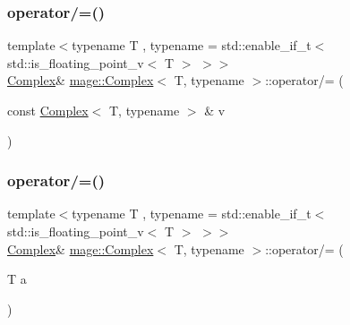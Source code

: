 \subsubsection{\texorpdfstring{operator/=()}{operator/=()}\hspace{0.1cm}{\footnotesize\ttfamily [1/2]}}
{\footnotesize\ttfamily template$<$typename T , typename  = std\+::enable\+\_\+if\+\_\+t$<$ std\+::is\+\_\+floating\+\_\+point\+\_\+v$<$ T $>$ $>$$>$ \\
\mbox{\hyperlink{structmage_1_1_complex}{Complex}}\& \mbox{\hyperlink{structmage_1_1_complex}{mage\+::\+Complex}}$<$ T, typename $>$\+::operator/= (\begin{DoxyParamCaption}\item[{const \mbox{\hyperlink{structmage_1_1_complex}{Complex}}$<$ T, typename $>$ \&}]{v }\end{DoxyParamCaption})\hspace{0.3cm}{\ttfamily [noexcept]}}

\mbox{\label{structmage_1_1_complex_ab400491e6811a1653f93c8d5f880cfcb}} 
\subsubsection{\texorpdfstring{operator/=()}{operator/=()}\hspace{0.1cm}{\footnotesize\ttfamily [2/2]}}
{\footnotesize\ttfamily template$<$typename T , typename  = std\+::enable\+\_\+if\+\_\+t$<$ std\+::is\+\_\+floating\+\_\+point\+\_\+v$<$ T $>$ $>$$>$ \\
\mbox{\hyperlink{structmage_1_1_complex}{Complex}}\& \mbox{\hyperlink{structmage_1_1_complex}{mage\+::\+Complex}}$<$ T, typename $>$\+::operator/= (\begin{DoxyParamCaption}\item[{T}]{a }\end{DoxyParamCaption})\hspace{0.3cm}{\ttfamily [noexcept]}}

\mbox{\label{structmage_1_1_complex_a218aa40a119f3f23b2c5b197fc34d694}} 

